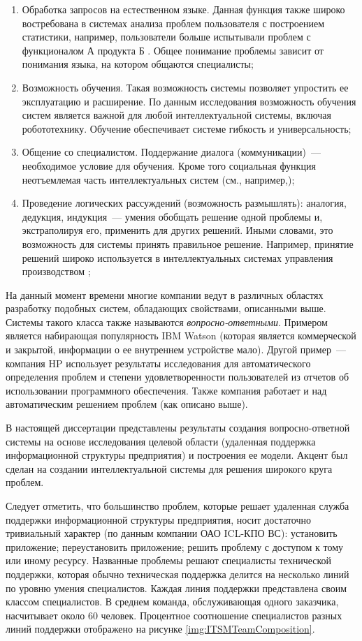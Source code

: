 \begin{enumerate}
  \item Обработка запросов на естественном языке. Данная функция также широко востребована в системах анализа проблем пользователя с построением статистики, например, пользователи больше испытывали проблем с функционалом А продукта Б \cite{TUTUB-1}. Общее понимание проблемы зависит от понимания языка, на котором общаются специалисты;
  \item Возможность обучения. Такая возможность системы позволяет упростить ее эксплуатацию и расширение. По данным исследования \cite{LEARN-1} возможность обучения систем является важной для любой интеллектуальной системы, включая робототехнику. Обучение обеспечивает системе гибкость и универсальность;
  \item Общение со специалистом. Поддержание диалога (коммуникации)~--- необходимое условие для обучения. Кроме того социальная функция неотъемлемая часть интеллектуальных систем (см., например,\cite{LEARN-2});
  \item Проведение логических рассуждений (возможность размышлять): аналогия, дедукция, индукция~--- умения обобщать решение одной проблемы и, экстраполируя его, применить для других решений. Иными словами, это возможность для системы принять правильное решение. Например, принятие решений широко используется в интеллектуальных системах управления производством \cite{LEARN-3};
\end{enumerate}

На данный момент времени многие компании ведут в различных областях разработку подобных систем, обладающих свойствами, описанными выше. Системы такого класса также называются \textit{вопросно-ответными}. Примером является набирающая популярность IBM Watson \cite{WATSON-PO} \cite{WATSON-PTOP} (которая является коммерческой и закрытой, информации о ее внутреннем устройстве мало). Другой пример~--- компания HP использует результаты исследования \cite{TUTUB-2} для автоматического определения проблем и степени удовлетворенности пользователей из отчетов об использовании программного обеспечения. Также компания работает и над автоматическим решением проблем (как описано выше). \par
В настоящей диссертации представлены результаты создания вопросно-ответной системы на основе исследования целевой области (удаленная поддержка информационной структуры предприятия) и построения ее модели.
 Акцент был сделан на создании интеллектуальной системы для решения широкого круга проблем. \par
Следует отметить, что большинство проблем, которые решает удаленная служба поддержки информационной структуры предприятия, носит достаточно тривиальный характер (по данным компании ОАО ICL-КПО ВС): установить приложение; переустановить приложение; решить проблему с доступом к тому или иному ресурсу.
Названные проблемы решают специалисты технической поддержки, которая обычно техническая поддержка делится на несколько линий по уровню умения специалистов. Каждая линия поддержки представлена своим классом специалистов. В среднем команда, обслуживающая одного заказчика, насчитывает около 60 человек. Процентное соотношение специалистов разных линий поддержки отображено на рисунке \ref{img:ITSMTeamComposition}.

